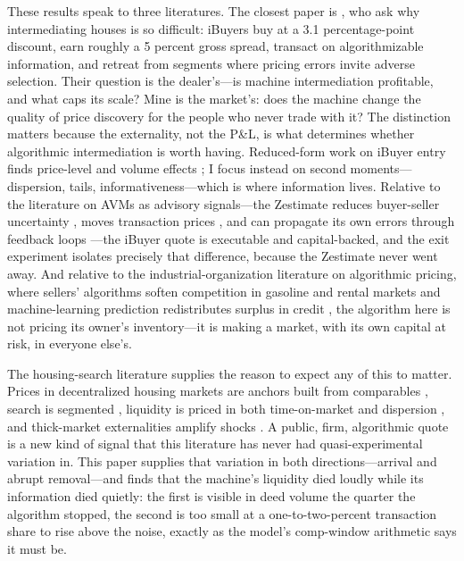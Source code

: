 \documentclass[12pt, letterpaper]{article}
\theoremstyle{remark}
\begin{document}
These results speak to three literatures. The closest paper is \citet{buchak2025intermediating}, who ask why intermediating houses is so difficult: iBuyers buy at a 3.1 percentage-point discount, earn roughly a 5 percent gross spread, transact on algorithmizable information, and retreat from segments where pricing errors invite adverse selection. Their question is the dealer's---is machine intermediation profitable, and what caps its scale? Mine is the market's: does the machine change the quality of price discovery for the people who never trade with it? The distinction matters because the externality, not the P\&L, is what determines whether algorithmic intermediation is worth having. Reduced-form work on iBuyer entry finds price-level and volume effects \citep{harrison2024impact, seiler2023burgeoning}; I focus instead on second moments---dispersion, tails, informativeness---which is where information lives. Relative to the literature on AVMs as advisory signals---the Zestimate reduces buyer-seller uncertainty \citep{fu2025unequal}, moves transaction prices \citep{yu2020algorithmic}, and can propagate its own errors through feedback loops \citep{fu2022feedback}---the iBuyer quote is executable and capital-backed, and the exit experiment isolates precisely that difference, because the Zestimate never went away. And relative to the industrial-organization literature on algorithmic pricing, where sellers' algorithms soften competition in gasoline and rental markets \citep{calvano2020artificial, assad2024algorithmic, calderwang2026algorithmic} and machine-learning prediction redistributes surplus in credit \citep{fuster2022predictably}, the algorithm here is not pricing its owner's inventory---it is making a market, with its own capital at risk, in everyone else's.

The housing-search literature supplies the reason to expect any of this to matter. Prices in decentralized housing markets are anchors built from comparables \citep{guren2018momentum}, search is segmented \citep{piazzesi2020segmented}, liquidity is priced in both time-on-market and dispersion \citep{jiang2024liquidity}, and thick-market externalities amplify shocks \citep{ngai2014hot}. A public, firm, algorithmic quote is a new kind of signal that this literature has never had quasi-experimental variation in. This paper supplies that variation in both directions---arrival and abrupt removal---and finds that the machine's liquidity died loudly while its information died quietly: the first is visible in deed volume the quarter the algorithm stopped, the second is too small at a one-to-two-percent transaction share to rise above the noise, exactly as the model's comp-window arithmetic says it must be.
\end{document}

